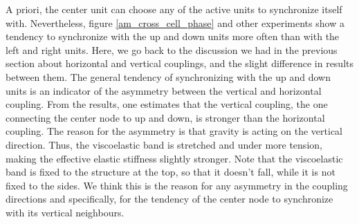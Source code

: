 \documentclass[11pt, a4paper]{article} %
\begin{document}
A priori, the center unit can choose any of the active units to synchronize itself with. Nevertheless, 
figure \ref{am_cross_cell_phase} and other experiments show a tendency to synchronize with the up and down units more 
often than with the left and right units. Here, we go back to the discussion we had in the previous section about 
horizontal and vertical couplings, and the slight difference in results between them. The general tendency of synchronizing 
with the up and down units is an indicator of the asymmetry between the vertical and horizontal coupling. From the results, 
one estimates that the vertical coupling, the one connecting the center node to up and down, is stronger than the horizontal coupling. 
The reason for the asymmetry is that gravity is acting on the vertical direction. Thus, the viscoelastic band is stretched and under more 
tension, making the effective elastic stiffness slightly stronger. Note that the viscoelastic band is fixed to the structure at the top, so 
that it doesn't fall, while it is not fixed to the sides. We think this is the reason for any asymmetry in the coupling directions 
and specifically, for the tendency of the center node to synchronize with its vertical neighbours. 
\end{document}
